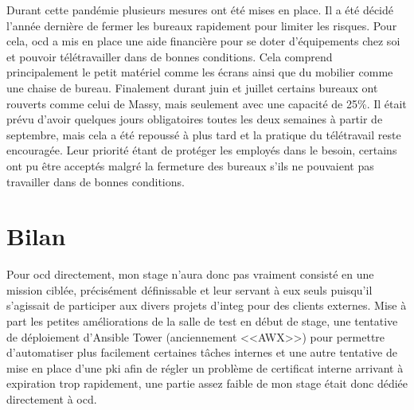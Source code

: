 \documentclass[12pt, oneside, a4paper, titlepage]{report}
\begin{document}
Durant cette pandémie plusieurs mesures ont été mises en place. Il a été décidé
l'année dernière de fermer les bureaux rapidement pour limiter les risques. Pour
cela, \gls{ocd} a mis en place une aide financière pour se doter d'équipements
chez soi et pouvoir télétravailler dans de bonnes conditions. Cela comprend
principalement le petit matériel comme les écrans ainsi que du mobilier comme
une chaise de bureau.  Finalement durant juin et juillet certains bureaux ont
rouverts comme celui de Massy, mais seulement avec une capacité de 25\%. Il
était prévu d'avoir quelques jours obligatoires toutes les deux semaines à
partir de septembre, mais cela a été repoussé à plus tard et la pratique du
télétravail reste encouragée. Leur priorité étant de protéger les employés dans
le besoin, certains ont pu être acceptés malgré la fermeture des bureaux s'ils
ne pouvaient pas travailler dans de bonnes conditions.


\chapter{Bilan}%
\label{cha:bilan}

Pour \acrlong{ocd} directement, mon stage n'aura donc pas vraiment consisté en
une mission ciblée, précisément définissable et leur servant à eux seuls
puisqu'il s'agissait de participer aux divers projets d'\gls{integ} pour des
clients externes. Mise à part les petites améliorations de la salle de test en
début de stage, une tentative de déploiement d'Ansible Tower (anciennement
<<AWX>>) pour permettre d'automatiser plus facilement certaines tâches internes
et une autre tentative de mise en place d'une \gls{pki} afin de régler un
problème de certificat interne arrivant à expiration trop rapidement, une partie
assez faible de mon stage était donc dédiée directement à \gls{ocd}.
\end{document}
